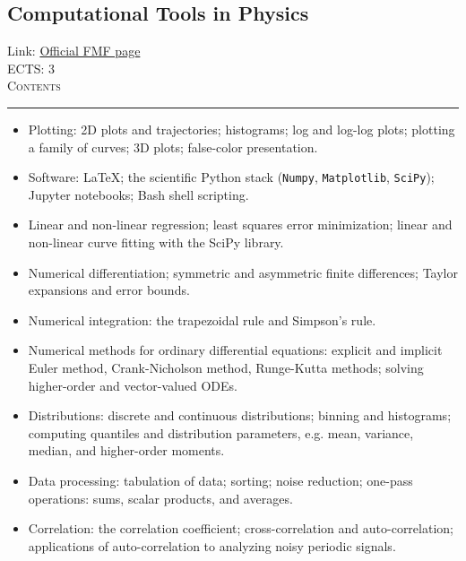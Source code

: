 \documentclass[11pt, a4paper]{article}
\newenvironment{course}[3]{
\subsection{#1}%
Link: \href{#2}{Official FMF page}\\%
ECTS: #3%
\vspace{1ex}
\\
{\large \textsc{Contents}}\\[-0.9ex]%
\rule{\textwidth}{0.5pt}
\vspace{-3ex}
}
{}
\newenvironment{chapter}[1]{
\begin{tcolorbox}[title=#1, breakable]
}
{\end{tcolorbox}}
\begin{document}
\begin{course}{Computational Tools in Physics}{https://www.fmf.uni-lj.si/en/study-physics/programmes/1fiz/2020/7000777/courses/1172/}{3}
    \label{computational-tools-in-physics}

    \begin{chapter}{Material}
        \begin{itemize}
            
            \item Plotting: 2D plots and trajectories; histograms; log and log-log plots; plotting a family of curves; 3D plots; false-color presentation.

            \item Software: \LaTeX; the scientific Python stack (\texttt{Numpy}, \texttt{Matplotlib}, \texttt{SciPy}); Jupyter notebooks; Bash shell scripting.

            \item Linear and non-linear regression; least squares error minimization; linear and non-linear curve fitting with the SciPy library.
        
            \item Numerical differentiation; symmetric and asymmetric finite differences; Taylor expansions and error bounds.

            \item Numerical integration: the trapezoidal rule and Simpson's rule.

            \item Numerical methods for ordinary differential equations: explicit and implicit Euler method, Crank-Nicholson method, Runge-Kutta methods; solving higher-order and vector-valued ODEs.

            \item Distributions: discrete and continuous distributions; binning and histograms; computing quantiles and distribution parameters, e.g. mean, variance, median, and higher-order moments.

            \item Data processing: tabulation of data; sorting; noise reduction; one-pass operations: sums, scalar products, and averages.

            \item Correlation: the correlation coefficient; cross-correlation and auto-correlation; applications of auto-correlation to analyzing noisy periodic signals.

        \end{itemize}
    \end{chapter}

\end{course}
\end{document}
